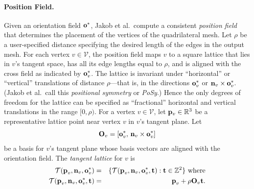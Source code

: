 \paragraph*{Position Field.}
Given an orientation field $\mathbf{o}^*$, Jakob et al.\ compute a consistent \emph{position field} that determines the placement of the vertices of the quadrilateral mesh. Let $\rho$ be a user-specified distance specifying the desired length of the edges in the output mesh. For each vertex $v \in \mathcal{V}$, the position field maps $v$ to a square lattice that lies in $v$'s tangent space, has all its edge lengths equal to $\rho$, and is aligned with the cross field as indicated by $\mathbf{o}^*_v$. The lattice is invariant under ``horizontal'' or ``vertical'' translations of distance $\rho$---that is, in the directions $\mathbf{o}^*_v$ or $\textbf{n}_v\times\mathbf{o}^*_v$. (Jakob et al.\ call this \emph{positional symmetry} or \emph{PoSy}.) Hence the only degrees of freedom for the lattice can be specified as ``fractional'' horizontal and vertical translations in the range $[0, \rho)$. For a vertex $v \in \mathcal{V}$, let $\mathbf{p}_v \in \mathbb{R}^3$ be a representative lattice point near vertex $v$ in $v$'s tangent plane. Let
\begin{equation*}
\textbf{O}_v =[\mathbf{o}^*_v,\,\textbf{n}_v\times\mathbf{o}^*_v]
\label{eq:frame}
\end{equation*}
be a basis for $v$'s tangent plane whose basis vectors are aligned with the orientation field.
The \emph{tangent lattice} for $v$ is
\begin{eqnarray*}
\mathcal{T}(\textbf{p}_v, \textbf{n}_v, \mathbf{o}^*_v) & = & \{ \mathcal{T}(\textbf{p}_v, \textbf{n}_v, \mathbf{o}^*_v, \textbf{t}): \mathbf{t} \in \mathbb{Z}^2 \}  \mbox{~where}  \\
\mathcal{T}(\textbf{p}_v, \textbf{n}_v, \mathbf{o}^*_v, \textbf{t}) & = & \textbf{p}_v + \rho \textbf{O}_v \textbf{t}.
\end{eqnarray*}

